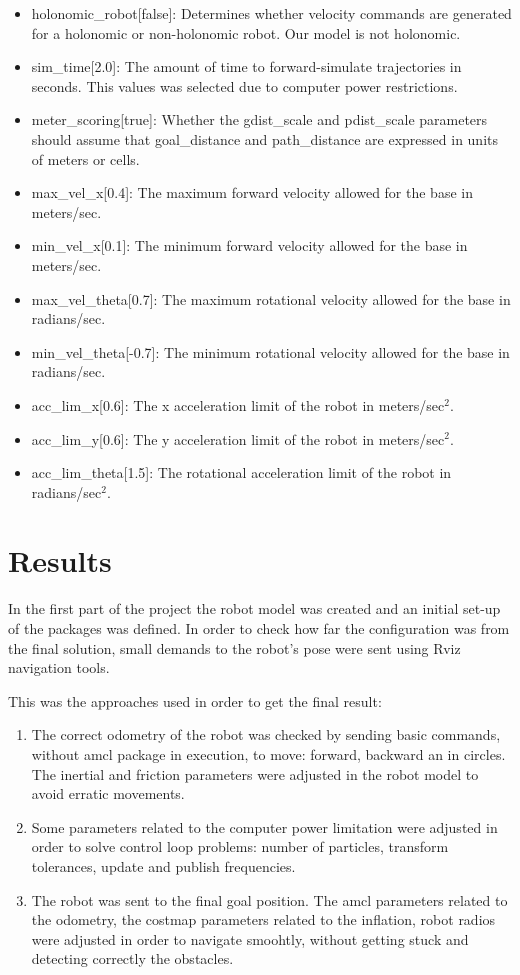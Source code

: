\documentclass[10pt,journal,compsoc]{IEEEtran}
\begin{document}
\begin{itemize}
\item holonomic\_robot[false]: Determines whether velocity commands are generated for a holonomic or non-holonomic robot. Our model is not holonomic.
\item sim\_time[2.0]: The amount of time to forward-simulate trajectories in seconds. This values was selected due to computer power restrictions.
\item meter\_scoring[true]: Whether the gdist\_scale and pdist\_scale parameters should assume that goal\_distance and path\_distance are expressed in units of meters or cells.
\item max\_vel\_x[0.4]: The maximum forward velocity allowed for the base in meters/sec.
\item min\_vel\_x[0.1]: The minimum forward velocity allowed for the base in meters/sec.
\item max\_vel\_theta[0.7]: The maximum rotational velocity allowed for the base in radians/sec.
\item min\_vel\_theta[-0.7]: The minimum rotational velocity allowed for the base in radians/sec.
\item acc\_lim\_x[0.6]: The x acceleration limit of the robot in meters/sec$^2$.
\item acc\_lim\_y[0.6]: The y acceleration limit of the robot in meters/sec$^2$.
\item acc\_lim\_theta[1.5]: The rotational acceleration limit of the robot in radians/sec$^2$.
\end{itemize}

\section{Results}

In the first part of the project the robot model was created and an initial set-up of the packages was defined. In order to check how far the configuration was from the final solution, small demands to the robot's pose were sent using Rviz navigation tools.

This was the approaches used in order to get the final result:
\begin{enumerate}
\item The correct odometry of the robot was checked by sending basic commands, without amcl package in execution, to move: forward, backward an in circles. The inertial and friction parameters were adjusted in the robot model to avoid erratic movements. 
\item Some parameters related to the computer power limitation were adjusted in order to solve control loop problems: number of particles, transform tolerances, update and publish frequencies.
\item The robot was sent to the final goal position. The amcl parameters related to the odometry, the costmap parameters related to the inflation, robot radios were adjusted in order to navigate smoohtly, without getting stuck and detecting correctly the obstacles.  
\end{enumerate}	
\end{document}
